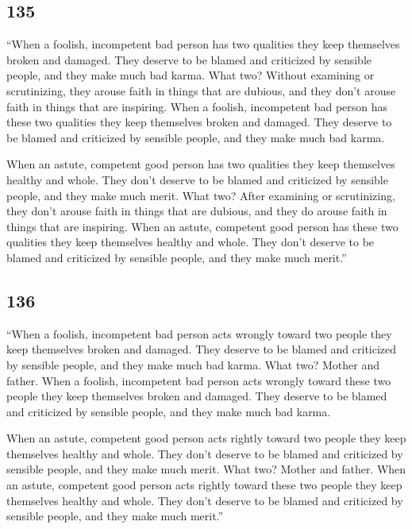 \documentclass[12pt,openany]{book}%
\begin{document}
\subsection*{135 }

“When a foolish, incompetent bad person has two qualities they keep themselves broken and damaged. They deserve to be blamed and criticized by sensible people, and they make much bad karma. What two? Without examining or scrutinizing, they arouse faith in things that are dubious, and they don’t arouse faith in things that are inspiring. When a foolish, incompetent bad person has these two qualities they keep themselves broken and damaged. They deserve to be blamed and criticized by sensible people, and they make much bad karma. 

When an astute, competent good person has two qualities they keep themselves healthy and whole. They don’t deserve to be blamed and criticized by sensible people, and they make much merit. What two? After examining or scrutinizing, they don’t arouse faith in things that are dubious, and they do arouse faith in things that are inspiring. When an astute, competent good person has these two qualities they keep themselves healthy and whole. They don’t deserve to be blamed and criticized by sensible people, and they make much merit.” 

\subsection*{136 }

“When a foolish, incompetent bad person acts wrongly toward two people they keep themselves broken and damaged. They deserve to be blamed and criticized by sensible people, and they make much bad karma. What two? Mother and father. When a foolish, incompetent bad person acts wrongly toward these two people they keep themselves broken and damaged. They deserve to be blamed and criticized by sensible people, and they make much bad karma. 

When an astute, competent good person acts rightly toward two people they keep themselves healthy and whole. They don’t deserve to be blamed and criticized by sensible people, and they make much merit. What two? Mother and father. When an astute, competent good person acts rightly toward these two people they keep themselves healthy and whole. They don’t deserve to be blamed and criticized by sensible people, and they make much merit.” 
\end{document}
